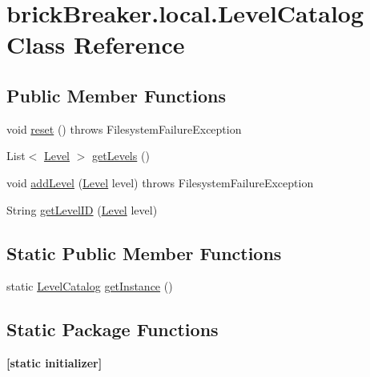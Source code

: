 \hypertarget{classbrick_breaker_1_1local_1_1_level_catalog}{
\section{brickBreaker.local.LevelCatalog Class Reference}
\label{classbrick_breaker_1_1local_1_1_level_catalog}
}
\subsection*{Public Member Functions}
\begin{DoxyCompactItemize}
\item 
void \hyperlink{classbrick_breaker_1_1local_1_1_level_catalog_a3cb48b330d53535457d9aeb4f2f7fb32}{reset} ()  throws FilesystemFailureException 
\item 
List$<$ \hyperlink{classbrick_breaker_1_1_level}{Level} $>$ \hyperlink{classbrick_breaker_1_1local_1_1_level_catalog_a34873e8d58b5e3570da7312b714f1e13}{getLevels} ()
\item 
void \hyperlink{classbrick_breaker_1_1local_1_1_level_catalog_a81201df02f319ba10645c3ee711cb777}{addLevel} (\hyperlink{classbrick_breaker_1_1_level}{Level} level)  throws FilesystemFailureException 
\item 
String \hyperlink{classbrick_breaker_1_1local_1_1_level_catalog_acb192b0db7f4a495d3674fa6b6996a56}{getLevelID} (\hyperlink{classbrick_breaker_1_1_level}{Level} level)
\end{DoxyCompactItemize}
\subsection*{Static Public Member Functions}
\begin{DoxyCompactItemize}
\item 
static \hyperlink{classbrick_breaker_1_1local_1_1_level_catalog}{LevelCatalog} \hyperlink{classbrick_breaker_1_1local_1_1_level_catalog_abeb4b9d17e6743896f3f02eeaa571a42}{getInstance} ()
\end{DoxyCompactItemize}
\subsection*{Static Package Functions}
\begin{DoxyCompactItemize}
\item 
\hypertarget{classbrick_breaker_1_1local_1_1_level_catalog_a7163b269c7bce462b7cf90bbd992a500}{
{\bfseries \mbox{[}static initializer\mbox{]}}}
\label{classbrick_breaker_1_1local_1_1_level_catalog_a7163b269c7bce462b7cf90bbd992a500}

\end{DoxyCompactItemize}



